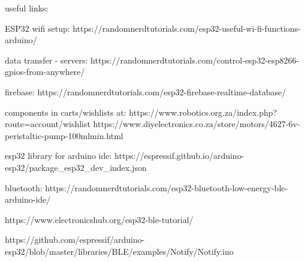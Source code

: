 useful links:

ESP32 wifi setup: https://randomnerdtutorials.com/esp32-useful-wi-fi-functions-arduino/

data transfer - servers: 
https://randomnerdtutorials.com/control-esp32-esp8266-gpios-from-anywhere/

firebase:
https://randomnerdtutorials.com/esp32-firebase-realtime-database/

components in carts/wishlists at: 
https://www.robotics.org.za/index.php?route=account/wishlist
https://www.diyelectronics.co.za/store/motors/4627-6v-peristaltic-pump-100mlmin.html

esp32 library for arduino ide:
https://espressif.github.io/arduino-esp32/package_esp32_dev_index.json

bluetooth:
https://randomnerdtutorials.com/esp32-bluetooth-low-energy-ble-arduino-ide/

https://www.electronicshub.org/esp32-ble-tutorial/

https://github.com/espressif/arduino-esp32/blob/master/libraries/BLE/examples/Notify/Notify.ino